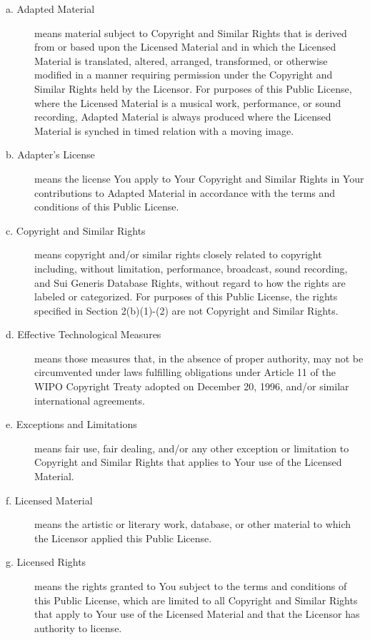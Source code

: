 \begin{description}
\item[a. Adapted Material] means material subject to Copyright and Similar Rights that is derived from or based upon the Licensed Material and in which the Licensed Material is translated, altered, arranged, transformed, or otherwise modified in a manner requiring permission under the Copyright and Similar Rights held by the Licensor. For purposes of this Public License, where the Licensed Material is a musical work, performance, or sound recording, Adapted Material is always produced where the Licensed Material is synched in timed relation with a moving image.

\item[b. Adapter's License] means the license You apply to Your Copyright and Similar Rights in Your contributions to Adapted Material in accordance with the terms and conditions of this Public License.

\item[c. Copyright and Similar Rights] means copyright and/or similar rights closely related to copyright including, without limitation, performance, broadcast, sound recording, and Sui Generis Database Rights, without regard to how the rights are labeled or categorized. For purposes of this Public License, the rights specified in Section 2(b)(1)-(2) are not Copyright and Similar Rights.

\item[d. Effective Technological Measures] means those measures that, in the absence of proper authority, may not be circumvented under laws fulfilling obligations under Article 11 of the WIPO Copyright Treaty adopted on December 20, 1996, and/or similar international agreements.

\item[e. Exceptions and Limitations] means fair use, fair dealing, and/or any other exception or limitation to Copyright and Similar Rights that applies to Your use of the Licensed Material.

\item[f. Licensed Material] means the artistic or literary work, database, or other material to which the Licensor applied this Public License.

\item[g. Licensed Rights] means the rights granted to You subject to the terms and conditions of this Public License, which are limited to all Copyright and Similar Rights that apply to Your use of the Licensed Material and that the Licensor has authority to license.


\end{description}
